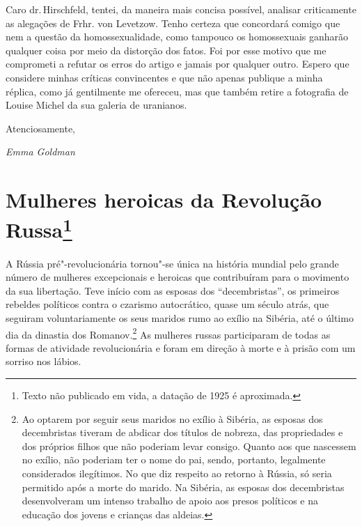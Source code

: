 Caro dr.\,Hirschfeld, tentei, da maneira mais concisa possível, analisar
criticamente as alegações de Frhr. von Levetzow. Tenho certeza que
concordará comigo que nem a questão da homossexualidade, como tampouco
os homossexuais ganharão qualquer coisa por meio da distorção dos fatos.
Foi por esse motivo que me comprometi a refutar os erros do artigo e
jamais por qualquer outro. Espero que considere minhas críticas
convincentes e que não apenas publique a minha réplica, como já
gentilmente me ofereceu, mas que também retire a fotografia de Louise
Michel da sua galeria de uranianos.

\smallskip

Atenciosamente,

\smallskip

\textit{Emma Goldman}




\chapter{Mulheres heroicas da Revolução Russa\footnote{Texto não publicado em
  vida, a datação de 1925 é aproximada.}}

A Rússia pré"-revolucionária tornou"-se única na história mundial pelo
grande número de mulheres excepcionais e heroicas que contribuíram para
o movimento da sua libertação. Teve início com as esposas dos
``decembristas'', os primeiros rebeldes políticos contra o czarismo
autocrático, quase um século atrás, que seguiram voluntariamente os
seus maridos rumo ao exílio na Sibéria, até o último dia da dinastia dos
Romanov.\footnote{Ao optarem por seguir seus maridos no exílio à
  Sibéria, as esposas dos decembristas tiveram de abdicar dos títulos de
  nobreza, das propriedades e dos próprios filhos que não poderiam levar consigo. Quanto aos que nascessem no exílio, não poderiam ter o nome do
  pai, sendo, portanto, legalmente considerados ilegítimos. No que diz respeito ao retorno à Rússia, só seria permitido
  após a morte do marido. Na Sibéria, as esposas dos decembristas desenvolveram um intenso trabalho de apoio aos presos políticos e na educação dos jovens e crianças das
  aldeias.} As mulheres russas participaram de todas as formas de
atividade revolucionária e foram em direção à morte e à prisão com um
sorriso nos lábios.

